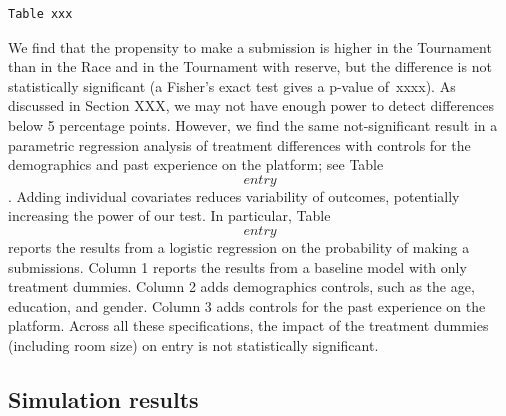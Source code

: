 \documentclass[12pt,]{article}
\theoremstyle{plain} %
\begin{document}
\begin{verbatim}
Table xxx
\end{verbatim}

We find that the propensity to make a submission is higher in the
Tournament than in the Race and in the Tournament with reserve, but the
difference is not statistically significant (a Fisher's exact test gives
a p-value of~xxxx). As discussed in Section XXX, we may not have enough
power to detect differences below 5 percentage points. However, we find
the same not-significant result in a parametric regression analysis of
treatment differences with controls for the demographics and past
experience on the platform; see Table \[entry\]. Adding individual
covariates reduces variability of outcomes, potentially increasing the
power of our test. In particular, Table \[entry\] reports the results
from a logistic regression on the probability of making a submissions.
Column 1 reports the results from a baseline model with only treatment
dummies. Column 2 adds demographics controls, such as the age,
education, and gender. Column 3 adds controls for the past experience on
the platform. Across all these specifications, the impact of the
treatment dummies (including room size) on entry is not statistically
significant.

\subsection{Simulation results}\label{simulation-results-1}

\renewcommand\refname{References}

\end{document}
